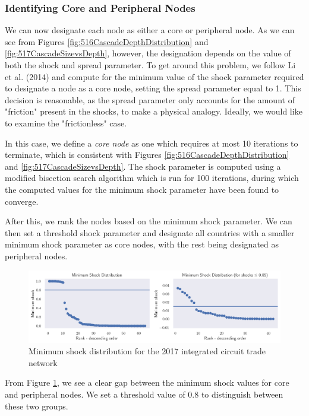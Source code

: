 \documentclass[12pt,letterpaper]{report}
\begin{document}
			\subsubsection{Identifying Core and Peripheral Nodes}
			\label{ssec:5313coreperiphery}			
				We can now designate each node as either a core or peripheral node. As we can see from Figures \ref{fig:516CascadeDepthDistribution} and \ref{fig:517CascadeSizevsDepth}, however, the designation depends on the value of both the shock and spread parameter. To get around this problem, we follow Li et al. (2014) and compute for the minimum value of the shock parameter required to designate a node as a core node, setting the spread parameter equal to 1. This decision is reasonable, as the spread parameter only accounts for the amount of "friction" present in the shocks, to make a physical analogy. Ideally, we would like to examine the "frictionless" case.
				
				In this case, we define a \textit{core node} as one which requires at most 10 iterations to terminate, which is consistent with Figures \ref{fig:516CascadeDepthDistribution} and \ref{fig:517CascadeSizevsDepth}. The shock parameter is computed using a modified bisection search algorithm which is run for 100 iterations, during which the computed values for the minimum shock parameter have been found to converge.
				
				After this, we rank the nodes based on the minimum shock parameter. We can then set a threshold shock parameter and designate all countries with a smaller minimum shock parameter as core nodes, with the rest being designated as peripheral nodes.
				
				\begin{figure}[!h]
					\centering
					\includegraphics[width=\textwidth]{Fig518-MinimumShock.png}
					\caption{Minimum shock  distribution for the 2017 integrated circuit trade network}\label{fig:518MinimumShock}
				\end{figure}
			
				From Figure \ref{fig:518MinimumShock}, we see a clear gap between the minimum shock values for core and peripheral nodes. We set a threshold value of 0.8 to distinguish between these two groups.
				
\end{document}
